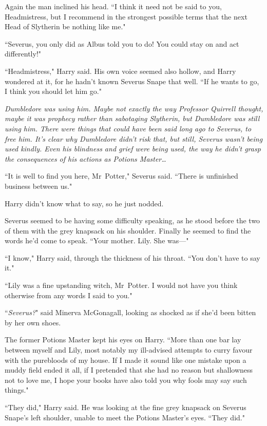 Again the man inclined his head. ``I think it need not be said to you, Headmistress, but I recommend in the strongest possible terms that the next Head of Slytherin be nothing like me."

``Severus, you only did as Albus told you to do! You could stay on and act differently!"

``Headmistress," Harry said. His own voice seemed also hollow, and Harry wondered at it, for he hadn't known Severus Snape that well. ``If he wants to go, I think you should let him go."

\emph{Dumbledore was using him. Maybe not exactly the way Professor Quirrell thought, maybe it was prophecy rather than sabotaging Slytherin, but Dumbledore was still using him. There were things that could have been said long ago to Severus, to free him. It's clear why Dumbledore didn't risk that, but still, Severus wasn't being used kindly. Even his blindness and grief were being used, the way he didn't grasp the consequences of his actions as Potions Master{\ldots}}

``It is well to find you here, Mr~Potter," Severus said. ``There is unfinished business between us."

Harry didn't know what to say, so he just nodded.

Severus seemed to be having some difficulty speaking, as he stood before the two of them with the grey knapsack on his shoulder. Finally he seemed to find the words he'd come to speak. ``Your mother. Lily. She was—"

``I know," Harry said, through the thickness of his throat. ``You don't have to say it."

``Lily was a fine upstanding witch, Mr~Potter. I would not have you think otherwise from any words I said to you."

``\emph{Severus?}" said Minerva McGonagall, looking as shocked as if she'd been bitten by her own shoes.

The former Potions Master kept his eyes on Harry. ``More than one bar lay between myself and Lily, most notably my ill-advised attempts to curry favour with the purebloods of my house. If I made it sound like one mistake upon a muddy field ended it all, if I pretended that she had no reason but shallowness not to love me, I hope your books have also told you why fools may say such things."

``They did," Harry said. He was looking at the fine grey knapsack on Severus Snape's left shoulder, unable to meet the Potions Master's eyes. ``They did."

